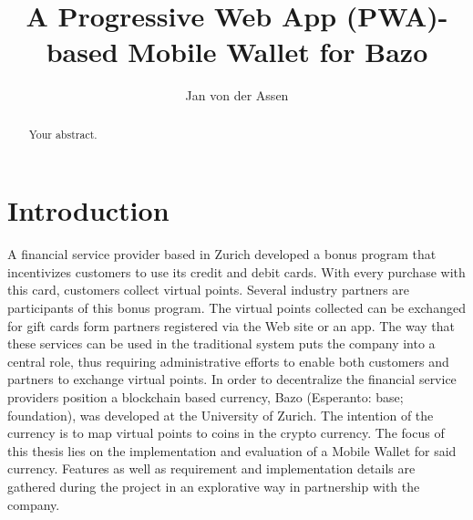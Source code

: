 \documentclass[a4paper]{article}
\title{A Progressive Web App (PWA)-based Mobile Wallet for Bazo}
\author{Jan von der Assen}
\begin{document}
\maketitle

\begin{abstract}
  Your abstract.
\end{abstract}
\newpage
\tableofcontents
\newpage


\section{Introduction}

A financial service provider based in Zurich developed a bonus program that incentivizes customers to use its credit and debit cards. With every purchase with this card, customers collect virtual points. Several industry partners are participants of this bonus program. The virtual points collected can be exchanged for gift cards form partners registered via the Web site or an app. The way that these services can be used in the traditional system puts the company into a central role, thus requiring administrative efforts to enable both customers and partners to exchange virtual points. In order to decentralize the financial service providers position a blockchain based currency, Bazo (Esperanto: base; foundation), was developed at the University of Zurich. The intention of the currency is to map virtual points to coins in the crypto currency.
The focus of this thesis lies on the implementation and evaluation of a Mobile Wallet for said currency. Features as well as requirement and implementation details are gathered during the project in an explorative way in partnership with the company.
\end{document}
